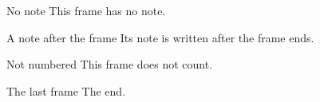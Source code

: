 \documentclass{beamer}
\begin{document}
\begin{frame}{No note}
  This frame has no note.
\end{frame}

\begin{frame}{A note after the frame}
  Its note is written after the frame ends.
\end{frame}

\begin{frame}[noframenumbering]{Not numbered}
  This frame does not count.
\end{frame}

\begin{frame}{The last frame}
  The end.
\end{frame}
\end{document}
